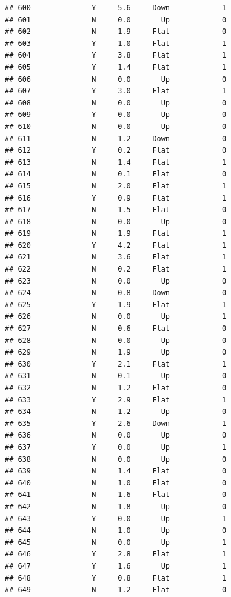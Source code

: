 \documentclass[
]{article}
\begin{document}
\begin{verbatim}
## 600              Y     5.6     Down            1
## 601              N     0.0       Up            0
## 602              N     1.9     Flat            0
## 603              Y     1.0     Flat            1
## 604              Y     3.8     Flat            1
## 605              Y     1.4     Flat            1
## 606              N     0.0       Up            0
## 607              Y     3.0     Flat            1
## 608              N     0.0       Up            0
## 609              Y     0.0       Up            0
## 610              N     0.0       Up            0
## 611              N     1.2     Down            0
## 612              Y     0.2     Flat            0
## 613              N     1.4     Flat            1
## 614              N     0.1     Flat            0
## 615              N     2.0     Flat            1
## 616              Y     0.9     Flat            1
## 617              N     1.5     Flat            0
## 618              N     0.0       Up            0
## 619              N     1.9     Flat            1
## 620              Y     4.2     Flat            1
## 621              N     3.6     Flat            1
## 622              N     0.2     Flat            1
## 623              N     0.0       Up            0
## 624              N     0.8     Down            0
## 625              Y     1.9     Flat            1
## 626              N     0.0       Up            1
## 627              N     0.6     Flat            0
## 628              N     0.0       Up            0
## 629              N     1.9       Up            0
## 630              Y     2.1     Flat            1
## 631              N     0.1       Up            0
## 632              N     1.2     Flat            0
## 633              Y     2.9     Flat            1
## 634              N     1.2       Up            0
## 635              Y     2.6     Down            1
## 636              N     0.0       Up            0
## 637              Y     0.0       Up            1
## 638              N     0.0       Up            0
## 639              N     1.4     Flat            0
## 640              N     1.0     Flat            0
## 641              N     1.6     Flat            0
## 642              N     1.8       Up            0
## 643              Y     0.0       Up            1
## 644              N     1.0       Up            0
## 645              N     0.0       Up            1
## 646              Y     2.8     Flat            1
## 647              Y     1.6       Up            1
## 648              Y     0.8     Flat            1
## 649              N     1.2     Flat            0

\end{verbatim}
\end{document}
